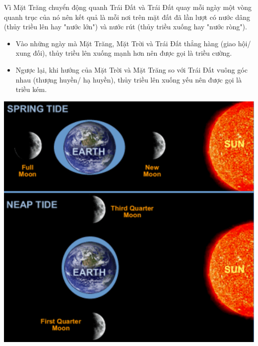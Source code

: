 Vì Mặt Trăng chuyển động quanh Trái Đất và Trái Đất quay mỗi ngày một vòng quanh trục của nó nên kết quả là mỗi nơi trên mặt đất đã lần lượt có nước dâng (thủy triều lên hay "nước lớn") và nước rút (thủy triều xuống hay "nước ròng").

\begin{minipage}{0.6\textwidth}
	\begin{itemize}
		\item Vào những ngày mà Mặt Trăng, Mặt Trời và Trái Đất thẳng hàng (giao hội/ xung đối), thủy triều lên xuống mạnh hơn nên được gọi là triều cường.
		\item Ngược lại, khi hướng của Mặt Trời và Mặt Trăng so với Trái Đất vuông góc nhau (thượng huyền/ hạ huyền), thủy triều lên xuống yếu nên được gọi là triều kém.
	\end{itemize}
\end{minipage}
\begin{minipage}{0.4\textwidth}
	\begin{center}
		\includegraphics[scale=0.45]{../figs/G10-035-4}
	\end{center}
	
\end{minipage}
